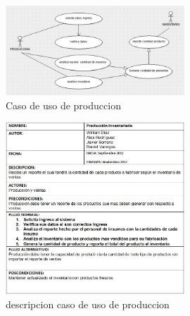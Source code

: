 \begin{figure}[htbp]
	\centering
		\includegraphics[width=0.60\textwidth]{images/casoproducciongrafico.jpg}
	\caption{Caso de uso de produccion}
	\label{fig:Caso de uso de produccion}
\end{figure}%
\begin{figure}[htbp]
	\centering
		\includegraphics[width=0.60\textwidth]{images/casoproducciontabla.jpg}
	\caption{descripcion caso de uso de produccion}
	\label{fig:descripcion caso de uso de produccion}
\end{figure}%
